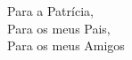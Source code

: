 \renewcommand{\dedicationlabel}{}
\begin{dedicatory}
\vfill
\begin{center}
Para a Patrícia,\\
Para os meus Pais,\\
Para os meus Amigos\\
\end{center}
\vfill
\end{dedicatory}